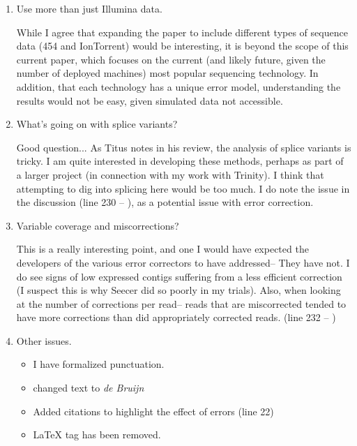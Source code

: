 \documentclass[11pt]{article}
\begin{document}
\begin{enumerate}
\item Use more than just Illumina data. 
\begin{addmargin}[2em]{2em}
While I agree that expanding the paper to include different types of sequence data (454 and IonTorrent) would be interesting, it is beyond the scope of this current paper, which focuses on the current (and likely future, given the number of deployed machines) most popular sequencing technology. In addition, that each technology has a unique error model, understanding the results would not be easy, given simulated data not accessible. 
\end{addmargin}

\item What's going on with splice variants? 
\begin{addmargin}[2em]{2em}
Good question... As Titus notes in his review, the analysis of splice variants is tricky. I am quite interested in developing these methods, perhaps as part of a larger project (in connection with my work with Trinity). I think that attempting to dig into splicing here would be too much. I do note the issue in the discussion (line 230 -- ), as a potential issue with error correction. 
\end{addmargin}


\item Variable coverage and miscorrections? 
\begin{addmargin}[2em]{2em}
This is a really interesting point, and one I would have expected the developers of the various error correctors to have addressed-- They have not. I do see signs of low expressed contigs suffering from a less efficient correction (I suspect this is why Seecer did so poorly in my trials). Also, when looking at the number of corrections per read-- reads that are miscorrected tended to have more corrections than did appropriately corrected reads. (line 232 -- )
\end{addmargin}

 



\item Other issues. 
\begin{addmargin}[2em]{2em}
\begin{itemize}
\item I have formalized punctuation.
\item changed text to \textit{de Bruijn} 
\item Added citations to highlight the effect of errors (line 22)
\item LaTeX tag has been removed.


\end{itemize}
\end{addmargin}

\end{enumerate}
\end{document}
